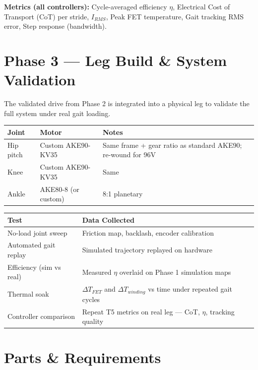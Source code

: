 \documentclass[11pt]{article}
\begin{document}
\vspace{0.2cm}
\noindent \textbf{Metrics (all controllers):} Cycle-averaged efficiency $\eta$, Electrical Cost of Transport (CoT) per stride, $I_{RMS}$, Peak FET temperature, Gait tracking RMS error, Step response (bandwidth).

\section*{Phase 3 — Leg Build \& System Validation}
The validated drive from Phase 2 is integrated into a physical leg to validate the full system under real gait loading.

\vspace{0.2cm}
\noindent
\begin{tabularx}{\textwidth}{@{}l l X@{}}
\toprule
\textbf{Joint} & \textbf{Motor} & \textbf{Notes} \\
\midrule
Hip pitch & Custom AKE90-KV35 & Same frame + gear ratio as standard AKE90; re-wound for 96V \\
Knee & Custom AKE90-KV35 & Same \\
Ankle & AKE80-8 (or custom) & 8:1 planetary \\
\bottomrule
\end{tabularx}

\vspace{0.2cm}
\noindent
\begin{tabularx}{\textwidth}{@{}l X@{}}
\toprule
\textbf{Test} & \textbf{Data Collected} \\
\midrule
No-load joint sweep & Friction map, backlash, encoder calibration \\
Automated gait replay & Simulated trajectory replayed on hardware \\
Efficiency (sim vs real) & Measured $\eta$ overlaid on Phase 1 simulation maps \\
Thermal soak & $\Delta T_{FET}$ and $\Delta T_{winding}$ vs time under repeated gait cycles \\
Controller comparison & Repeat T5 metrics on real leg — CoT, $\eta$, tracking quality \\
\bottomrule
\end{tabularx}

\section*{Parts \& Requirements}
\end{document}
